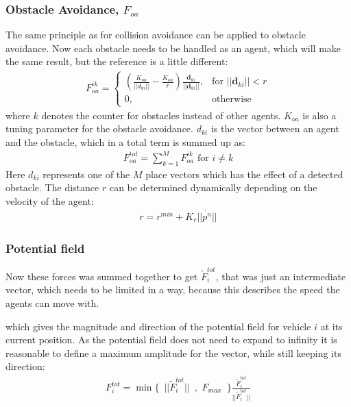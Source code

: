 \subsubsection{Obstacle Avoidance, $F_{oa}$}
The same principle as for collision avoidance can be applied to
obstacle avoidance. Now each obstacle needs to be handled as an agent,
which will make the same result, but the reference is a little
different:
\begin{align}
    F_{oa}^{ik}= 
\begin{cases}
    \left( \frac{K_{oa}}{||d_{ki}||}-\frac{K_{oa}}{r}\right)
		\frac{\mathbf{d}_{{ki}}}{||\mathbf{d}_{ki}||},& \text{for } ||\mathbf{d}_{ki}||<r\\
    0,              & \text{otherwise}
\end{cases}
\end{align}
where $k$ denotes the counter for obstacles instead of other agents.
$K_{oa}$ is also a tuning parameter for the obstacle avoidance.
$d_{ki}$ is the vector between an agent and the obstacle, which in a
total term is summed up as:
\begin{align}
F_{oa}^{tot} = \sum\limits_{k=1}^MF_{oa}^{ik} \text{ for } i\neq k
\end{align}
Here $d_{ki}$ represents one of the $M$ place vectors which has the
effect of a detected obstacle.  The distance $r$ can be determined
dynamically depending on the velocity of the agent:
\begin{align}
r = r^{min} + K_r||\dot{p^n}||
\end{align}

\subsubsection{Potential field}
Now these forces was summed together to get
$\tilde{F}_i^{tot}$, that was just an intermediate vector, which needs
to be limited in a way, because this describes the speed the agents
can move with.

which gives the magnitude and direction of the
potential field for vehicle $i$ at its current position. As the
potential field does not need to expand to infinity it is reasonable
to define a maximum amplitude for the vector, while still keeping its
direction:
\begin{align}
	F_i^{tot} = \min\{\,\,\,||\tilde{F}_i^{tot}||\,\,\,,\,\,F_{max}\,\,\,\}\frac{\tilde{F}_i^{tot}}{||\tilde{F}_i^{tot}||}
\end{align}



